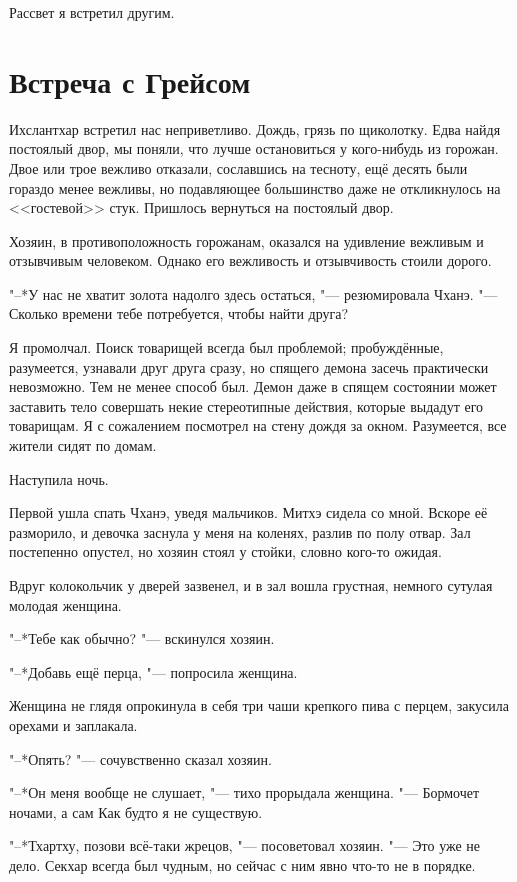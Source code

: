 \documentclass[a4paper,10pt,fleqn]{book}
\newcommand{\ldotst}{\so{...}\xspace}
\begin{document}
Рассвет я встретил другим.

\section{Встреча с Грейсом}

Ихслантхар встретил нас неприветливо.
Дождь, грязь по щиколотку.
Едва найдя постоялый двор, мы поняли, что лучше остановиться у кого-нибудь из горожан.
Двое или трое вежливо отказали, сославшись на тесноту, ещё десять были гораздо менее вежливы, но подавляющее большинство даже не откликнулось на <<гостевой>> стук.
Пришлось вернуться на постоялый двор.

Хозяин, в противоположность горожанам, оказался на удивление вежливым и отзывчивым человеком.
Однако его вежливость и отзывчивость стоили дорого.

"--*У нас не хватит золота надолго здесь остаться, "--- резюмировала Чханэ.
"--- Сколько времени тебе потребуется, чтобы найти друга?

Я промолчал.
Поиск товарищей всегда был проблемой;
пробуждённые, разумеется, узнавали друг друга сразу, но спящего демона засечь практически невозможно.
Тем не менее способ был.
Демон даже в спящем состоянии может заставить тело совершать некие стереотипные действия, которые выдадут его товарищам.
Я с сожалением посмотрел на стену дождя за окном.
Разумеется, все жители сидят по домам.

Наступила ночь.

Первой ушла спать Чханэ, уведя мальчиков.
Митхэ сидела со мной.
Вскоре её разморило, и девочка заснула у меня на коленях, разлив по полу отвар.
Зал постепенно опустел, но хозяин стоял у стойки, словно кого-то ожидая.

Вдруг колокольчик у дверей зазвенел, и в зал вошла грустная, немного сутулая молодая женщина.

"--*Тебе как обычно? "--- вскинулся хозяин.

"--*Добавь ещё перца, "--- попросила женщина.

Женщина не глядя опрокинула в себя три чаши крепкого пива с перцем, закусила орехами и заплакала.

"--*Опять? "--- сочувственно сказал хозяин.

"--*Он меня вообще не слушает, "--- тихо прорыдала женщина.
"--- Бормочет ночами, а сам\ldotst
Как будто я не существую.

"--*Тхартху, позови всё-таки жрецов, "--- посоветовал хозяин.
"--- Это уже не дело.
Секхар всегда был чудным, но сейчас с ним явно что-то не в порядке.
\end{document}
